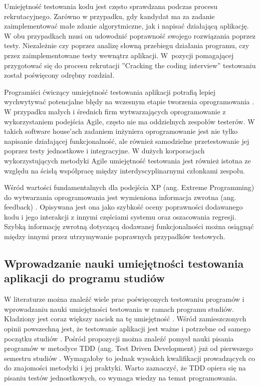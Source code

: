 Umiejętność testowania kodu jest często sprawdzana podczas procesu rekrutacyjnego.
Zarówno w przypadku, gdy kandydat ma za zadanie zaimplementować małe zdanie algorytmiczne, jak i napisać działającą aplikację.
W obu przypadkach musi on udowodnić poprawność swojego rozwiązania poprzez testy.
Niezależnie czy poprzez analizę słowną przebiegu działania programu, czy przez zaimplementowane testy wewnątrz aplikacji.
W~pozycji pomagającej przygotować się do procesu rekrutacji ”Cracking the coding interview” \cite{cracking-the-coding-interview} testowaniu został poświęcony odrębny rozdział.

Programiści ćwiczący umiejętność testowania aplikacji potrafią lepiej wychwytywać potencjalne błędy na wczesnym etapie tworzenia oprogramowania \cite{testing-better-error-catch}.
W przypadku małych i średnich firm wytwarzających oprogramowanie z wykorzystaniem podejścia Agile, często nie ma oddzielnych zespołów testerów.
W takich software house'ach zadaniem inżyniera oprogramowanie jest nie tylko napisanie działającej funkcjonalność, ale również samodzielne przetestowanie jej poprzez testy jednostkowe i integracyjne.
W dużych korporacjach wykorzystujących metodyki Agile umiejętność testowania jest również istotna ze względu na ścisłą współpracę między interdyscyplinarnymi członkami zespołu.

Wśród wartości fundamentalnych dla podejścia XP (ang. Extreme Programming) do wytwarzania oprogramowania jest wymieniona informacja zwrotna (ang. feedback) \cite{extreem-programming}.
Opisywana jest ona jako szybkość oceny poprawności dodawanego kodu i jego interakcji z innymi częściami systemu oraz oszacowania regresji.
Szybką informację zwrotną dotyczącą dodawanej funkcjonalności można osiągnąć między innymi przez utrzymywanie poprawnych przypadków testowych.

\subsection{Wprowadzanie nauki umiejętności testowania aplikacji do programu studiów}
\label{test_studies}

W literaturze można znaleźć wiele prac poświęconych testowaniu programów i wprowadzaniu nauki umiejętności testowania w ramach programu studiów.
Kładziony jest coraz większy nacisk na tę umiejętność \cite{tests-important}.
Wśród zamieszczonych opinii powszechną jest, że testowanie aplikacji jest ważne i potrzebne od samego początku studiów \cite{test-from-scratch}.
Pośród propozycji można znaleźć pomysł nauki pisania programów w metodyce TDD (ang. Test Driven Development) już od pierwszego semestru studiów \cite{tdd-on-start}.
Wymagałoby to jednak wysokich kwalifikacji prowadzących co do znajomości metodyki i jej praktyki.
Warto zaznaczyć, że TDD opiera się na pisaniu testów jednostkowych, co wymaga wiedzy na temat programowania.

